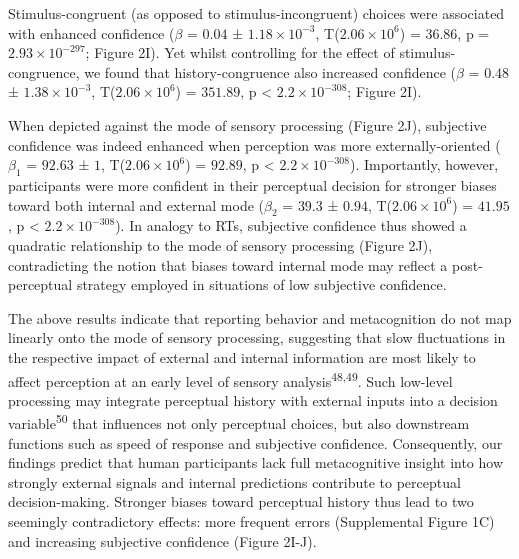 \documentclass[
]{article}
\begin{document}
Stimulus-congruent (as opposed to stimulus-incongruent) choices were
associated with enhanced confidence (\(\beta\) = \(0.04\) ±
\(\ensuremath{1.18\times 10^{-3}}\),
T(\(\ensuremath{2.06\times 10^{6}}\)) = \(36.86\), p =
\(\ensuremath{2.93\times 10^{-297}}\); Figure 2I). Yet whilst
controlling for the effect of stimulus-congruence, we found that
history-congruence also increased confidence (\(\beta\) = \(0.48\) ±
\(\ensuremath{1.38\times 10^{-3}}\),
T(\(\ensuremath{2.06\times 10^{6}}\)) = \(351.89\), p < \(\ensuremath{2.2\times 10^{-308}}\); Figure
2I).

When depicted against the mode of sensory processing (Figure 2J),
subjective confidence was indeed enhanced when perception was more
externally-oriented (\(\beta_1\) = \(92.63\) ± \(1\),
T(\(\ensuremath{2.06\times 10^{6}}\)) = \(92.89\), p < \(\ensuremath{2.2\times 10^{-308}}\)).
Importantly, however, participants were more confident in their
perceptual decision for stronger biases toward both internal and
external mode (\(\beta_2\) = \(39.3\) ± \(0.94\),
T(\(\ensuremath{2.06\times 10^{6}}\)) = \(41.95\), p < \(\ensuremath{2.2\times 10^{-308}}\)). In
analogy to RTs, subjective confidence thus showed a quadratic
relationship to the mode of sensory processing (Figure 2J),
contradicting the notion that biases toward internal mode may reflect a
post-perceptual strategy employed in situations of low subjective
confidence.

The above results indicate that reporting behavior and metacognition do
not map linearly onto the mode of sensory processing, suggesting that
slow fluctuations in the respective impact of external and internal
information are most likely to affect perception at an early level of
sensory analysis\textsuperscript{48,49}. Such low-level processing may
integrate perceptual history with external inputs into a decision
variable\textsuperscript{50} that influences not only perceptual
choices, but also downstream functions such as speed of response and
subjective confidence. Consequently, our findings predict that human
participants lack full metacognitive insight into how strongly external
signals and internal predictions contribute to perceptual
decision-making. Stronger biases toward perceptual history thus lead to
two seemingly contradictory effects: more frequent errors (Supplemental
Figure 1C) and increasing subjective confidence (Figure 2I-J).
\end{document}
